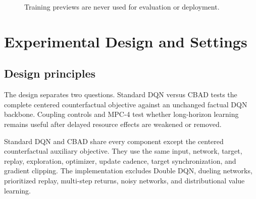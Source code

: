 \documentclass[11pt]{article}
\begin{document}
\begin{figure}[H]
\centering
{}
\par\smallskip
\caption*{Training previews are never used for evaluation or deployment.}
\label{alg:cbad}
\end{figure}

\section{Experimental Design and Settings}
\label{sec:experiments}

\subsection{Design principles}

The design separates two questions. Standard DQN versus CBAD tests the complete centered counterfactual objective against an unchanged factual DQN backbone. Coupling controls and MPC-4 test whether long-horizon learning remains useful after delayed resource effects are weakened or removed.

Standard DQN and CBAD share every component except the centered counterfactual auxiliary objective. They use the same input, network, target, replay, exploration, optimizer, update cadence, target synchronization, and gradient clipping. The implementation excludes Double DQN, dueling networks, prioritized replay, multi-step returns, noisy networks, and distributional value learning.
\end{document}
